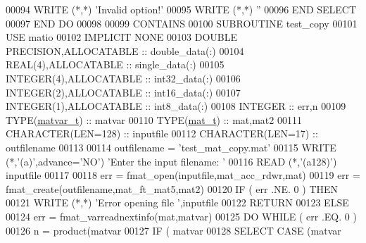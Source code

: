\begin{DoxyCode}
00094                 \textcolor{keyword}{WRITE} (*,*) \textcolor{stringliteral}{'Invalid option!'}
00095                 \textcolor{keyword}{WRITE} (*,*) \textcolor{stringliteral}{''}
00096 \textcolor{keywordflow}{        END SELECT}
00097 \textcolor{keywordflow}{    END DO}
00098 
00099 \textcolor{keyword}{CONTAINS}
00100 \textcolor{keyword}{    SUBROUTINE }test\_copy
00101     \textcolor{keywordtype}{USE }matio
00102     \textcolor{keywordtype}{IMPLICIT NONE}
00103         \textcolor{keywordtype}{DOUBLE PRECISION},\textcolor{keywordtype}{ALLOCATABLE} :: double\_data(:)
00104         \textcolor{keywordtype}{REAL(4)},\textcolor{keywordtype}{ALLOCATABLE}          :: single\_data(:)
00105         \textcolor{keywordtype}{INTEGER(4)},\textcolor{keywordtype}{ALLOCATABLE}       :: int32\_data(:)
00106         \textcolor{keywordtype}{INTEGER(2)},\textcolor{keywordtype}{ALLOCATABLE}       :: int16\_data(:)
00107         \textcolor{keywordtype}{INTEGER(1)},\textcolor{keywordtype}{ALLOCATABLE}       :: int8\_data(:)
00108         \textcolor{keywordtype}{INTEGER}            :: err,n
00109         \textcolor{keywordtype}{TYPE}(\hyperlink{group___m_a_t_structmatvar__t}{matvar\_t})     :: matvar
00110         \textcolor{keywordtype}{TYPE}(\hyperlink{group___m_a_t_gab0fc888f5a5d79943b16284b1f91c2e8}{mat\_t})        :: mat,mat2
00111         \textcolor{keywordtype}{CHARACTER(LEN=128)} :: inputfile
00112         \textcolor{keywordtype}{CHARACTER(LEN=17)}  :: outfilename
00113 
00114         outfilename = \textcolor{stringliteral}{'test\_mat\_copy.mat'}
00115         \textcolor{keyword}{WRITE} (*,\textcolor{stringliteral}{'(a)'},advance=\textcolor{stringliteral}{'NO'}) \textcolor{stringliteral}{'Enter the input filename: '}
00116         \textcolor{keyword}{READ} (*,\textcolor{stringliteral}{'(a128)'}) inputfile
00117 
00118         err = fmat\_open(inputfile,mat\_acc\_rdwr,mat)
00119         err = fmat\_create(outfilename,mat\_ft\_mat5,mat2)
00120         \textcolor{keywordflow}{IF} ( err .NE. 0 ) \textcolor{keywordflow}{THEN}
00121             \textcolor{keyword}{WRITE} (*,*) \textcolor{stringliteral}{'Error opening file '},inputfile
00122             \textcolor{keywordflow}{RETURN}
00123         \textcolor{keywordflow}{ELSE}
00124             err = fmat\_varreadnextinfo(mat,matvar)
00125             \textcolor{keywordflow}{DO} \textcolor{keywordflow}{WHILE} ( err .EQ. 0 )
00126                 n = product(matvar%
00127                 \textcolor{keywordflow}{IF} ( matvar%
00128                 \textcolor{keywordflow}{SELECT CASE} (matvar%

\end{DoxyCode}
